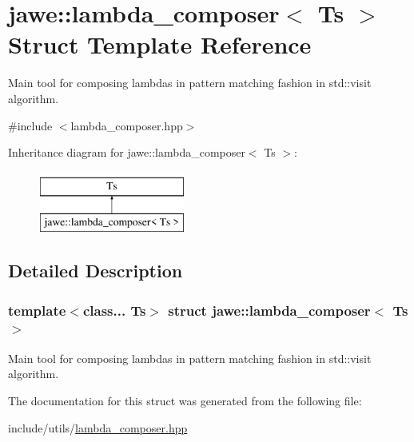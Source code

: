 \hypertarget{structjawe_1_1lambda__composer}{}\section{jawe\+:\+:lambda\+\_\+composer$<$ Ts $>$ Struct Template Reference}
\label{structjawe_1_1lambda__composer}


Main tool for composing lambdas in pattern matching fashion in std\+::visit algorithm.  




{\ttfamily \#include $<$lambda\+\_\+composer.\+hpp$>$}

Inheritance diagram for jawe\+:\+:lambda\+\_\+composer$<$ Ts $>$\+:\begin{figure}[H]
\begin{center}
\leavevmode
\includegraphics[height=2.000000cm]{structjawe_1_1lambda__composer}
\end{center}
\end{figure}


\subsection{Detailed Description}
\subsubsection*{template$<$class... Ts$>$\newline
struct jawe\+::lambda\+\_\+composer$<$ Ts $>$}

Main tool for composing lambdas in pattern matching fashion in std\+::visit algorithm. 

The documentation for this struct was generated from the following file\+:\begin{DoxyCompactItemize}
\item 
include/utils/\hyperlink{lambda__composer_8hpp}{lambda\+\_\+composer.\+hpp}\end{DoxyCompactItemize}
